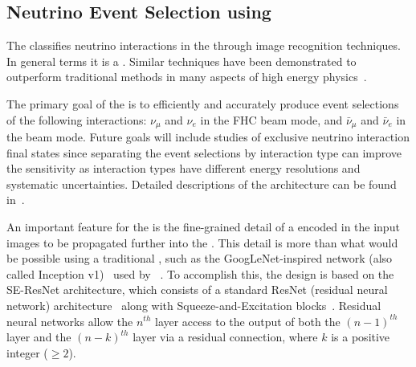 
\subsection{Neutrino Event Selection using }
The   classifies neutrino interactions in the   through image recognition techniques. In general terms it is a . Similar techniques have been demonstrated to outperform traditional methods in many aspects of high energy physics~\cite{Radovic:2018dip}.

The primary goal of the  is to efficiently and accurately produce event selections of the following interactions: $\nu_{\mu}$  and $\nu_{e}$  in the FHC beam mode, and $\bar{\nu}_\mu$  and $\bar{\nu}_e$  in the  beam mode. Future goals will include studies of exclusive neutrino interaction final states since separating the event selections by interaction type can improve the sensitivity as interaction types have different energy resolutions and systematic uncertainties. Detailed descriptions of the  architecture can be found in~\cite{Aurisano:2016jvx}.

An important feature for the   is the fine-grained detail of a  encoded in the input images to be propagated further into the . This detail is more than what would be possible using a traditional , such as the GoogLeNet-inspired network (also called Inception v1)~\cite{GoogLeNet} used by ~\cite{Aurisano:2016jvx}. To accomplish this, the  design is based on the SE-ResNet architecture, which consists of a standard ResNet (residual neural network) architecture~\cite{He-et-al-2015-deep} along with Squeeze-and-Excitation blocks~\cite{Hu-et-al-2017-squeeze}. Residual neural networks allow the $n^{th}$ layer access to the output of both the $(n-1)^{th}$ layer and the $(n-k)^{th}$ layer via a residual connection, where $k$ is a positive integer ($\ge 2$).

